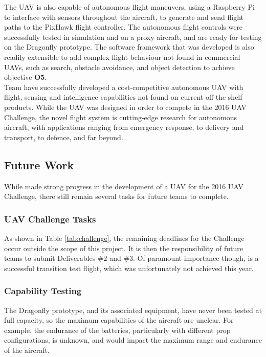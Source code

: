 The UAV is also capable of autonomous flight maneuvers, using a Raspberry Pi to interface with sensors throughout the aircraft, to generate and send flight paths to the PixHawk flight controller. The autonomous flight controls were successfully tested in simulation and on a proxy aircraft, and are ready for testing on the Dragonfly prototype. The software framework that was developed is also readily extensible to add complex flight behaviour not found in commercial UAVs, such as search, obstacle avoidance, and object detection to achieve objective \textbf{O5}.\\

Team \ID have successfully developed a cost-competitive autonomous UAV with flight, sensing and intelligence capabilities not found on current off-the-shelf products. While the UAV was designed in order to compete in the 2016 UAV Challenge, the novel flight system is cutting-edge research for autonomous aircraft, with applications ranging from emergency response, to delivery and transport, to defence, and far beyond.

\subsection{Future Work}
While \ID made strong progress in the development of a UAV for the 2016 UAV Challenge, there still remain several tasks for future teams to complete.

\subsubsection*{UAV Challenge Tasks}
As shown in Table \ref{tab:challenge}, the remaining deadlines for the Challenge occur outside the scope of this project. It is then the responsibility of future teams to submit Deliverables \#2 and \#3.  Of paramount importance though, is a successful transition test flight, which was unfortunately not achieved this year.

\subsubsection*{Capability Testing}
The Dragonfly prototype, and its associated equipment, have never been tested at full capacity, so the maximum capabilities of the aircraft are unclear. For example, the endurance of the batteries, particularly with different prop configurations, is unknown, and would impact the maximum range and endurance of the aircraft.

